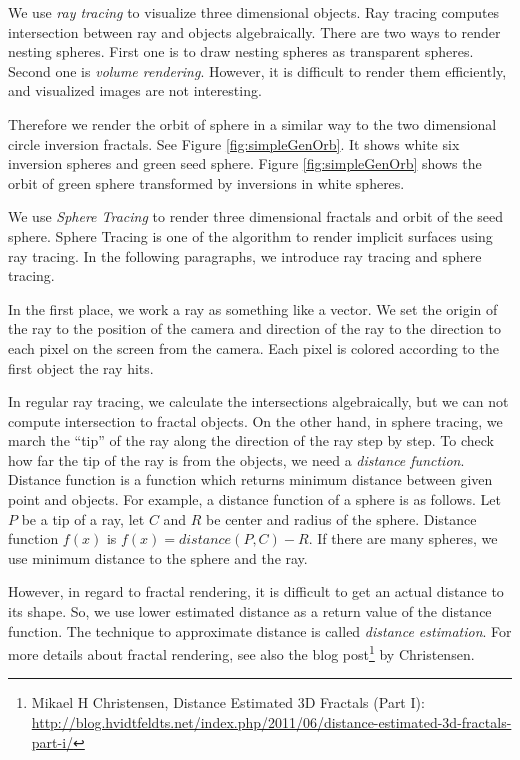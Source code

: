 We use \textit{ray tracing} to visualize three dimensional objects.
Ray tracing computes intersection between ray and objects algebraically.
There are two ways to render nesting spheres. First one is to draw
nesting spheres as transparent spheres.
Second one is \textit{volume rendering}.
However, it is difficult to render them efficiently, and
visualized images are not interesting.

Therefore we render the orbit of sphere in a similar way to the two
dimensional circle inversion fractals.
See Figure \ref{fig:simpleGenOrb}. It shows
white six inversion spheres and green seed sphere.
Figure \ref{fig:simpleGenOrb} shows the orbit of
green sphere transformed by inversions in white spheres.

We use \textit{Sphere Tracing} \cite{hart1996sphere} to render three dimensional
fractals and orbit of the seed sphere.
Sphere Tracing is one of the algorithm to render implicit surfaces using
ray tracing.
In the following paragraphs, we introduce ray tracing and
 sphere tracing.

In the first place, we work a ray as something like a vector.
We set the origin of the ray to the position of the camera
and direction of the ray to the direction to each pixel on the screen
from the camera. Each pixel is colored according to the
first object the ray hits. 

In regular ray tracing, we calculate the intersections algebraically, but
we can not compute intersection to fractal objects.
On the other hand, in sphere tracing, we march the ``tip'' of the ray
along the direction of the ray step by step. 
To check how far the tip of the ray is from the objects, we need a
\textit{distance function}.
Distance function is a function which returns minimum distance between
given point and objects.
For example, a distance function of a sphere is as follows.
Let $P$ be a tip of a ray, let $C$ and $R$ be center and
radius of the sphere.
Distance function $f(x)$ is $f(x) = distance(P, C) - R$.
If there are many spheres, we use minimum distance to the sphere and the ray.

However, in regard to fractal rendering, it is difficult to
get an actual distance to its shape. So, we use lower estimated distance
as a return value of the distance function. The technique to approximate
distance is called \textit{distance estimation}.
For more details about fractal rendering, see also the blog
post\footnote{Mikael H Christensen, Distance Estimated 3D Fractals (Part I):\\ \quad\quad
\url{http://blog.hvidtfeldts.net/index.php/2011/06/distance-estimated-3d-fractals-part-i/}}
by Christensen. 

